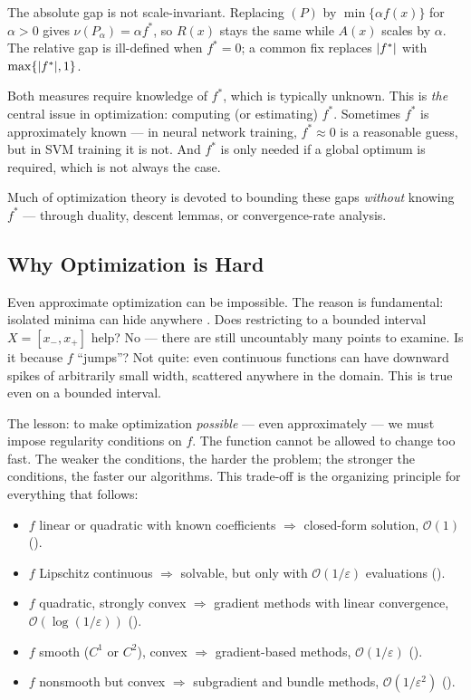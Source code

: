 The absolute gap is not scale-invariant. Replacing $(P)$ by $\min\{\alpha f(x)\}$ for $\alpha > 0$ gives $\nu(P_\alpha) = \alpha f^*$, so $R(x)$ stays the same while $A(x)$ scales by $\alpha$. The relative gap is ill-defined when $f^* = 0$; a common fix replaces $\lvert f^*\rvert$ with $\max\{\lvert f^*\rvert, 1\}$.

Both measures require knowledge of $f^*$, which is typically unknown. This is \emph{the} central issue in optimization: computing (or estimating) $f^*$. Sometimes $f^*$ is approximately known --- in neural network training, $f^* \approx 0$ is a reasonable guess, but in SVM training it is not. And $f^*$ is only needed if a global optimum is required, which is not always the case.

Much of optimization theory is devoted to bounding these gaps \emph{without} knowing $f^*$ --- through duality, descent lemmas, or convergence-rate analysis.


\subsection{Why Optimization is Hard}\label{ssec:why-hard}

Even approximate optimization can be impossible.
The reason is fundamental: isolated minima can hide anywhere \cite{hansen1995}.
Does restricting to a bounded interval $X = [x_-, x_+]$ help?
No --- there are still uncountably many points to examine.
Is it because $f$ ``jumps''?
Not quite: even continuous functions can have downward spikes of arbitrarily small width, scattered anywhere in the domain.
This is true even on a bounded interval.

The lesson: to make optimization \emph{possible} --- even approximately --- we must impose regularity conditions on $f$.
The function cannot be allowed to change too fast.
The weaker the conditions, the harder the problem; the stronger the conditions, the faster our algorithms.
This trade-off is the organizing principle for everything that follows:
\begin{itemize}
	\item $f$ linear or quadratic with known coefficients $\Longrightarrow$ closed-form solution, $\mathcal{O}(1)$ ().
	\item $f$ Lipschitz continuous $\Longrightarrow$ solvable, but only with $\mathcal{O}(1/\varepsilon)$ evaluations ().
	\item $f$ quadratic, strongly convex $\Longrightarrow$ gradient methods with linear convergence, $\mathcal{O}(\log(1/\varepsilon))$ ().
	\item $f$ smooth ($C^1$ or $C^2$), convex $\Longrightarrow$ gradient-based methods, $\mathcal{O}(1/\varepsilon)$ ().
	\item $f$ nonsmooth but convex $\Longrightarrow$ subgradient and bundle methods, $\mathcal{O}(1/\varepsilon^2)$ ().
\end{itemize}

